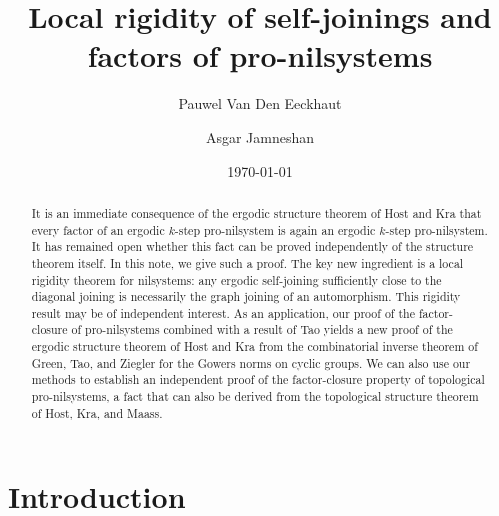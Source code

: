 \documentclass[12pt]{amsart}
\theoremstyle{plain}
\theoremstyle{definition}
\begin{document}

\baselineskip=17pt




\title[]{Local rigidity of self-joinings and factors of pro-nilsystems}

\author[P. Eeckhaut]{Pauwel Van Den Eeckhaut}
\address{Institute of Mathematics \\ University of Bonn \\ 53113 Bonn, Germany}


\author[A. Jamneshan]{Asgar Jamneshan}
\address{Institute of Mathematics \\ University of Bonn \\ 53113 Bonn, Germany}


\date{\today}


\begin{abstract}  
It is an immediate consequence of the ergodic structure theorem of Host and Kra that every factor of an ergodic $k$-step pro-nilsystem is again an ergodic $k$-step pro-nilsystem. It has remained open whether this fact can be proved independently of the structure theorem itself. In this note, we give such a proof. The key new ingredient is a local rigidity theorem for nilsystems: any ergodic self-joining sufficiently close to the diagonal joining is necessarily the graph joining of an automorphism. This rigidity result may be of independent interest. As an application, our proof of the factor-closure of pro-nilsystems combined with a result of Tao yields a new proof of the ergodic structure theorem of Host and Kra from the combinatorial inverse theorem of Green, Tao, and Ziegler for the Gowers norms on cyclic groups. We can also use our methods to establish an independent proof of the factor-closure property of topological pro-nilsystems, a fact that can also be derived from the topological structure theorem of Host, Kra, and Maass.
\end{abstract}


\keywords{}

\maketitle

\section{Introduction}
\end{document}
